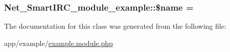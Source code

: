 \subsubsection[{\texorpdfstring{\$name}{$name}}]{\setlength{\rightskip}{0pt plus 5cm}Net\+\_\+\+Smart\+I\+R\+C\+\_\+module\+\_\+example\+::\$name = \textquotesingle{}\textquotesingle{}}\hypertarget{classNet__SmartIRC__module__example_aaebd09582fd081d9afff44777c85c8d8}{}\label{classNet__SmartIRC__module__example_aaebd09582fd081d9afff44777c85c8d8}


The documentation for this class was generated from the following file\+:\begin{DoxyCompactItemize}
\item 
app/example/\hyperlink{example_8module_8php}{example.\+module.\+php}\end{DoxyCompactItemize}
